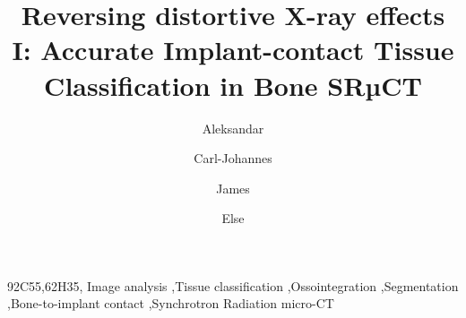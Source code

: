 \documentclass[times,twocolumn,final]{elsarticle}
\begin{document}

\begin{frontmatter}

\title{
  Reversing distortive X-ray effects I:
  Accurate Implant-contact Tissue Classification in Bone SRµCT
}%

\author[1]{Aleksandar }
\author[1]{Carl-Johannes }
\author[1,2]{James }
\author[3]{Else }

\address[1]{University of Copenhagen, Niels Bohr Institute}
\address[2]{University of Copenhagen, Department of Computer Science}
\address[3]{University of Southern Denmark}



\begin{abstract}
  
\end{abstract}

\begin{keyword}
\MSC 92C55\sep 62H35\sep
\KWD Image analysis \sep Tissue classification \sep Ossointegration \sep Segmentation \sep Bone-to-implant contact \sep Synchrotron Radiation micro-CT
\end{keyword}

\end{frontmatter}
















\appendix


\end{document}
